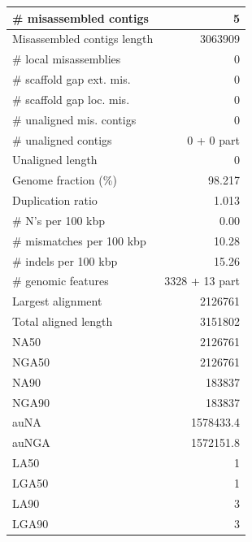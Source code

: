 \documentclass[12pt,a4paper]{article}
\begin{document}
\begin{table}[ht]
\begin{center}
\begin{tabular}{|l*{1}{|r}|}
\# misassembled contigs & 5 \\ \hline
Misassembled contigs length & 3063909 \\ \hline
\# local misassemblies & 0 \\ \hline
\# scaffold gap ext. mis. & 0 \\ \hline
\# scaffold gap loc. mis. & 0 \\ \hline
\# unaligned mis. contigs & 0 \\ \hline
\# unaligned contigs & 0 + 0 part \\ \hline
Unaligned length & 0 \\ \hline
Genome fraction (\%) & 98.217 \\ \hline
Duplication ratio & 1.013 \\ \hline
\# N's per 100 kbp & 0.00 \\ \hline
\# mismatches per 100 kbp & 10.28 \\ \hline
\# indels per 100 kbp & 15.26 \\ \hline
\# genomic features & 3328 + 13 part \\ \hline
Largest alignment & 2126761 \\ \hline
Total aligned length & 3151802 \\ \hline
NA50 & 2126761 \\ \hline
NGA50 & 2126761 \\ \hline
NA90 & 183837 \\ \hline
NGA90 & 183837 \\ \hline
auNA & 1578433.4 \\ \hline
auNGA & 1572151.8 \\ \hline
LA50 & 1 \\ \hline
LGA50 & 1 \\ \hline
LA90 & 3 \\ \hline
LGA90 & 3 \\ \hline
\end{tabular}
\end{center}
\end{table}
\end{document}
